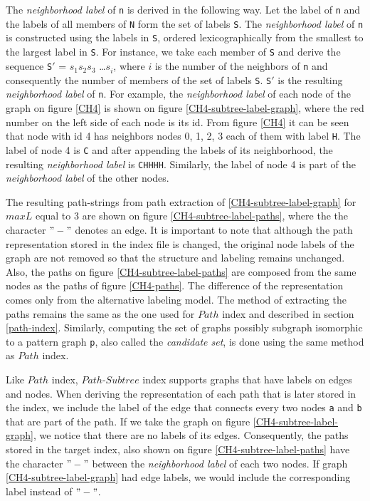 \documentclass{l4proj}
\newcounter{example}[section]
\begin{document}
The \textit{neighborhood label} of \texttt{n} is derived in the following way. Let the label of \texttt{n} and the labels of all members of \texttt{N} form the set of labels \texttt{S}. The \textit{neighborhood label} of \texttt{n} is constructed using the labels in \texttt{S}, ordered lexicographically from the smallest to the largest label in \texttt{S}. For instance, we take each member of \texttt{S} and derive the sequence \texttt{S$'$} = $s^{}_1$$s^{}_2$$s^{}_3$ \ldots $s^{}_i$, where $i$ is the number of the neighbors of \texttt{n} and consequently the number of members of the set of labels \texttt{S}. \texttt{S$'$} is the resulting \textit{neighborhood label} of \texttt{n}. For example, the \textit{neighborhood label} of each node of the graph on figure \ref{CH4} is shown on figure \ref{CH4-subtree-label-graph}, where the red number on the left side of each node is its id. From figure \ref{CH4} it can be seen that node with id 4 has neighbors nodes 0, 1, 2, 3 each of them with label \texttt{H}. The label of node 4 is \texttt{C} and after appending the labels of its neighborhood, the resulting \textit{neighborhood label} is \texttt{CHHHH}. Similarly, the label of node 4 is part of the \textit{neighborhood label} of the other nodes.\par
The resulting path-strings from path extraction of \ref{CH4-subtree-label-graph} for $maxL$ equal to 3 are shown on figure \ref{CH4-subtree-label-paths}, where the the character $"-"$ denotes an edge. It is important to note that although the path representation stored in the index file is changed, the original node labels of the graph are not removed so that the structure and labeling remains unchanged. Also, the paths on figure \ref{CH4-subtree-label-paths} are composed from the same nodes as the paths of figure \ref{CH4-paths}. The difference of the representation comes only from the alternative labeling model. The method of extracting the paths remains the same as the one used for $Path$ index and described in section \ref{path-index}. Similarly, computing the set of graphs possibly subgraph isomorphic to a pattern graph \texttt{p}, also called the \textit{candidate set}, is done using the same method as $Path$ index.\par
Like $Path$ index, $Path$-$Subtree$ index supports graphs that have labels on edges and nodes. When deriving the representation of each path that is later stored in the index, we include the label of the edge that connects every two nodes \texttt{a} and \texttt{b} that are part of the path. If we take the graph on figure \ref{CH4-subtree-label-graph}, we notice that there are no labels of its edges. Consequently, the paths stored in the target index, also shown on figure \ref{CH4-subtree-label-paths} have the character $"-"$ between the \textit{neighborhood label} of each two nodes. If graph \ref{CH4-subtree-label-graph} had edge labels, we would include the corresponding label instead of $"-"$. \par  
\end{document}
